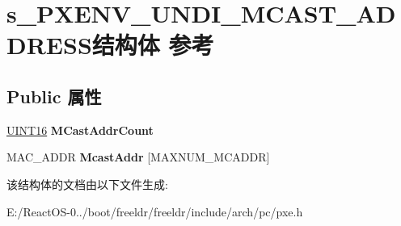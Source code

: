 \hypertarget{structs___p_x_e_n_v___u_n_d_i___m_c_a_s_t___a_d_d_r_e_s_s}{}\section{s\+\_\+\+P\+X\+E\+N\+V\+\_\+\+U\+N\+D\+I\+\_\+\+M\+C\+A\+S\+T\+\_\+\+A\+D\+D\+R\+E\+S\+S结构体 参考}
\label{structs___p_x_e_n_v___u_n_d_i___m_c_a_s_t___a_d_d_r_e_s_s}
\subsection*{Public 属性}
\begin{DoxyCompactItemize}
\item 
\mbox{\label{structs___p_x_e_n_v___u_n_d_i___m_c_a_s_t___a_d_d_r_e_s_s_a6ea4ffa2cb0067a9080ffbc1dc118387}} 
\hyperlink{_processor_bind_8h_a09f1a1fb2293e33483cc8d44aefb1eb1}{U\+I\+N\+T16} {\bfseries M\+Cast\+Addr\+Count}
\item 
\mbox{\label{structs___p_x_e_n_v___u_n_d_i___m_c_a_s_t___a_d_d_r_e_s_s_aac15ab4705f17baa084bf436091e33fe}} 
M\+A\+C\+\_\+\+A\+D\+DR {\bfseries Mcast\+Addr} \mbox{[}M\+A\+X\+N\+U\+M\+\_\+\+M\+C\+A\+D\+DR\mbox{]}
\end{DoxyCompactItemize}


该结构体的文档由以下文件生成\+:\begin{DoxyCompactItemize}
\item 
E\+:/\+React\+O\+S-\/0../boot/freeldr/freeldr/include/arch/pc/pxe.\+h\end{DoxyCompactItemize}
